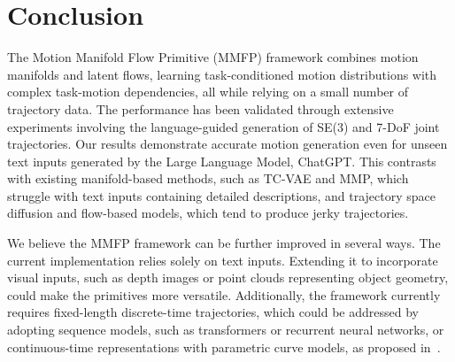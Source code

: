 \section{Conclusion}
\label{sec:conclusion}
The Motion Manifold Flow Primitive (MMFP) framework combines motion manifolds and latent flows, learning task-conditioned motion distributions with complex task-motion dependencies, all while relying on a small number of trajectory data. The performance has been validated through extensive experiments involving the language-guided generation of SE(3) and 7-DoF joint trajectories. Our results demonstrate accurate motion generation even for unseen text inputs generated by the Large Language Model, ChatGPT. This contrasts with existing manifold-based methods, such as TC-VAE and MMP, which struggle with text inputs containing detailed descriptions, and trajectory space diffusion and flow-based models, which tend to produce jerky trajectories.

We believe the MMFP framework can be further improved in several ways. The current implementation relies solely on text inputs. Extending it to incorporate visual inputs, such as depth images or point clouds representing object geometry, could make the primitives more versatile. Additionally, the framework currently requires fixed-length discrete-time trajectories, which could be addressed by adopting sequence models, such as transformers or recurrent neural networks, or continuous-time representations with parametric curve models, as proposed in~\cite{lee2024mmp++}.